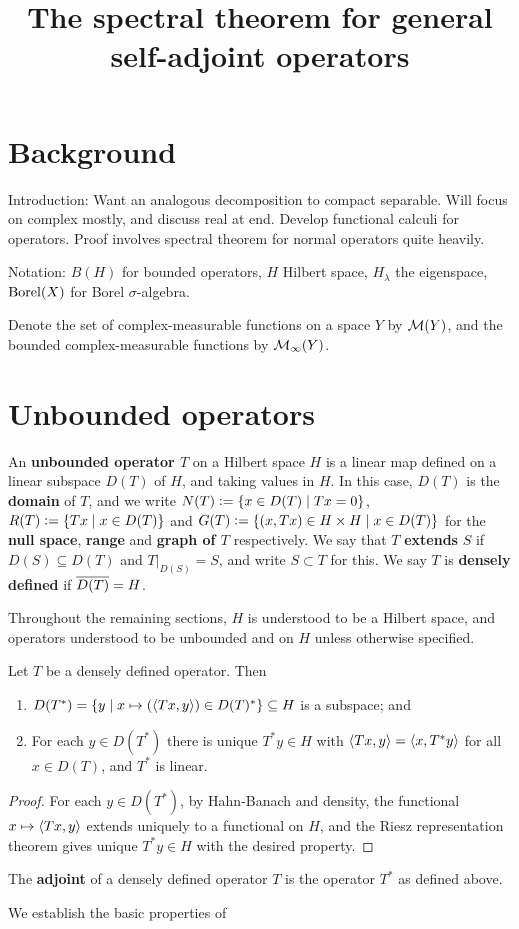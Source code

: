 \documentclass[10pt]{amsart}
\title{The spectral theorem for general self-adjoint operators}
\begin{document}
\maketitle
\section{Background}
Introduction: Want an analogous decomposition to compact separable. Will focus on complex mostly, and discuss real at end. Develop functional calculi for operators. Proof involves spectral theorem for normal operators quite heavily.

Notation: $B(H)$ for bounded operators, $H$ Hilbert space, $H_\lambda$ the eigenspace, $\operatorname{Borel}(X)$ for Borel $\sigma$-algebra. 

Denote the set of complex-measurable functions on a space $Y$ by $\mathcal{M}(Y)$, and the bounded complex-measurable functions by $\mathcal{M}_\infty(Y)$. 
\section{Unbounded operators}
An \textbf{unbounded operator $T$} on a Hilbert space $H$ is a linear map defined on a linear subspace $D(T)$ of $H$, and taking values in $H$. In this case, $D(T)$ is the \textbf{domain} of $T$, and we write $N(T) \vcentcolon= \left\{  x \in D(T) \mid Tx = 0  \right\}$, $R(T) \vcentcolon= \left\{  Tx \mid x \in D(T)  \right\}$ and $G(T) \vcentcolon= \left\{  (x, Tx) \in H \times H \mid x \in D(T)  \right\}$ for the \textbf{null space}, \textbf{range} and \textbf{graph of $T$} respectively. We say that $T$ \textbf{extends} $S$ if $D(S) \subseteq D(T)$ and $T|_{D(S)} = S$, and write $S \subset T$ for this. We say $T$ is \textbf{densely defined} if $\overline{D(T)} = H$.

Throughout the remaining sections, $H$ is understood to be a Hilbert space, and operators understood to be unbounded and on $H$ unless otherwise specified.
\begin{lemma}
    Let $T$ be a densely defined operator. Then
    \begin{enumerate}
        \item $D(T^*) = \left\{  y \mid x \mapsto (\left\langle Tx, y \right\rangle) \in D(T)^*  \right\} \subseteq H$ is a subspace; and
        \item For each $y \in D(T^*)$ there is unique $T^*y \in H$ with $\left\langle Tx, y \right\rangle = \left\langle x, T^*y \right\rangle$ for all $x \in D(T)$, and $T^*$ is linear.
    \end{enumerate}
\end{lemma}
\begin{proof}
    For each $y \in D(T^*)$, by Hahn-Banach and density, the functional $x \mapsto \left\langle Tx, y \right\rangle$ extends uniquely to a functional on $H$, and the Riesz representation theorem gives unique $T^*y \in H$ with the desired property.
\end{proof}
\begin{definition}[Adjoint]
    The \textbf{adjoint} of a densely defined operator $T$ is the operator $T^*$ as defined above. 
\end{definition}
We establish the basic properties of 
\end{document}
